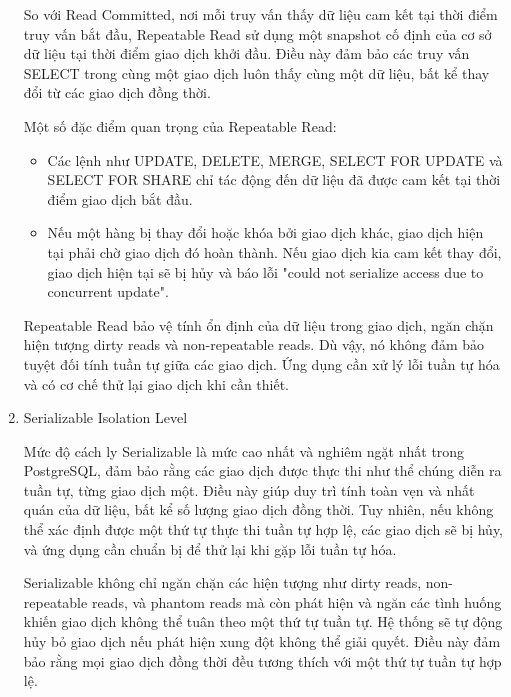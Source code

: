 \begin{enumerate}
    \hspace{1cm}So với Read Committed, nơi mỗi truy vấn thấy dữ liệu cam kết tại thời điểm truy vấn bắt đầu, Repeatable Read sử dụng một snapshot cố định của cơ sở dữ liệu tại thời điểm giao dịch khởi đầu. Điều này đảm bảo các truy vấn SELECT trong cùng một giao dịch luôn thấy cùng một dữ liệu, bất kể thay đổi từ các giao dịch đồng thời.

    \hspace{1cm}Một số đặc điểm quan trọng của Repeatable Read:
    \begin{itemize}
        \item Các lệnh như UPDATE, DELETE, MERGE, SELECT FOR UPDATE và SELECT FOR SHARE chỉ tác động đến dữ liệu đã được cam kết tại thời điểm giao dịch bắt đầu.
        \item Nếu một hàng bị thay đổi hoặc khóa bởi giao dịch khác, giao dịch hiện tại phải chờ giao dịch đó hoàn thành. Nếu giao dịch kia cam kết thay đổi, giao dịch hiện tại sẽ bị hủy và báo lỗi "could not serialize access due to concurrent update".
    \end{itemize}

    \hspace{1cm} Repeatable Read bảo vệ tính ổn định của dữ liệu trong giao dịch, ngăn chặn hiện tượng dirty reads và non-repeatable reads. Dù vậy, nó không đảm bảo tuyệt đối tính tuần tự giữa các giao dịch. Ứng dụng cần xử lý lỗi tuần tự hóa và có cơ chế thử lại giao dịch khi cần thiết.
    \item Serializable Isolation Level

    \hspace{1cm}Mức độ cách ly Serializable là mức cao nhất và nghiêm ngặt nhất trong PostgreSQL, đảm bảo rằng các giao dịch được thực thi như thể chúng diễn ra tuần tự, từng giao dịch một. Điều này giúp duy trì tính toàn vẹn và nhất quán của dữ liệu, bất kể số lượng giao dịch đồng thời. Tuy nhiên, nếu không thể xác định được một thứ tự thực thi tuần tự hợp lệ, các giao dịch sẽ bị hủy, và ứng dụng cần chuẩn bị để thử lại khi gặp lỗi tuần tự hóa.

    \hspace{1cm}Serializable không chỉ ngăn chặn các hiện tượng như dirty reads, non-repeatable reads, và phantom reads mà còn phát hiện và ngăn các tình huống khiến giao dịch không thể tuân theo một thứ tự tuần tự. Hệ thống sẽ tự động hủy bỏ giao dịch nếu phát hiện xung đột không thể giải quyết. Điều này đảm bảo rằng mọi giao dịch đồng thời đều tương thích với một thứ tự tuần tự hợp lệ.


\end{enumerate}
